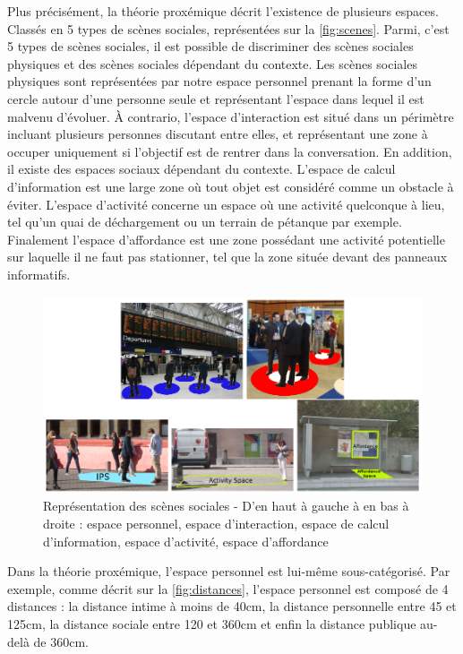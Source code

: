 Plus précisément, la théorie proxémique décrit l'existence de plusieurs espaces. Classés en 5 types de scènes sociales, représentées sur la \autoref{fig:scenes}. Parmi, c'est 5 types de scènes sociales, il est possible de discriminer des scènes sociales physiques et des scènes sociales dépendant du contexte. Les scènes sociales physiques sont représentées par notre espace personnel prenant la forme d'un cercle autour d'une personne seule et représentant l'espace dans lequel il est malvenu d'évoluer. À contrario, l'espace d'interaction est situé dans un périmètre incluant plusieurs personnes discutant entre elles, et représentant une zone à occuper uniquement si l'objectif est de rentrer dans la conversation. En addition, il existe des espaces sociaux dépendant du contexte. L'espace de calcul d'information est une large zone où tout objet est considéré comme un obstacle à éviter. L'espace d'activité concerne un espace où une activité quelconque à lieu, tel qu'un quai de déchargement ou un terrain de pétanque par exemple. Finalement l'espace d'affordance est une zone possédant une activité potentielle sur laquelle il ne faut pas stationner, tel que la zone située devant des panneaux informatifs.

\begin{figure}[ht!]
    \centering
    \includegraphics[width=\linewidth]{Rapport/images/scene_sociales.PNG}
    \caption{Représentation des scènes sociales - D'en haut à gauche à en bas à droite : espace personnel, espace d'interaction, espace de calcul d'information, espace d'activité, espace d'affordance}
    \label{fig:scenes}
\end{figure}

\newpage

Dans la théorie proxémique, l'espace personnel est lui-même sous-catégorisé. Par exemple, comme décrit sur la \autoref{fig:distances}, l'espace personnel est composé de 4 distances : la distance intime à moins de 40cm, la distance personnelle entre 45 et 125cm, la distance sociale entre 120 et 360cm et enfin la distance publique au-delà de 360cm.

